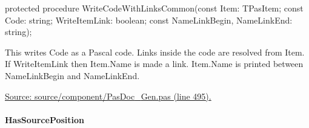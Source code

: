 \documentclass{report}
\newif\ifpdf
\begin{document}
\label{PasDoc_Gen.TDocGenerator-WriteCodeWithLinksCommon}
\begin{list}{}{
\setlength{\itemindent}{0cm}
\setlength{\listparindent}{0cm}
\setlength{\leftmargin}{\evensidemargin}
\addtolength{\leftmargin}{\tmplength}
\settowidth{\labelsep}{X}
\addtolength{\leftmargin}{\labelsep}
\setlength{\labelwidth}{\tmplength}
}
\item[\textbf{Declaration}\hfill]
\ifpdf
\begin{flushleft}
\fi
\begin{ttfamily}
protected procedure WriteCodeWithLinksCommon(const Item: TPasItem; const Code: string; WriteItemLink: boolean; const NameLinkBegin, NameLinkEnd: string);\end{ttfamily}

\ifpdf
\end{flushleft}
\fi

\par
\item[\textbf{Description}]
This writes Code as a Pascal code. Links inside the code are resolved from Item. If WriteItemLink then Item.Name is made a link. Item.Name is printed between NameLinkBegin and NameLinkEnd.\par
\href{https://github.com/pasdoc/pasdoc/blob/master/source/component/PasDoc_Gen.pas#L495}{Source: source/component/PasDoc{\_}Gen.pas (line 495).}

\end{list}
\paragraph*{HasSourcePosition}\hspace*{\fill}
\end{document}
